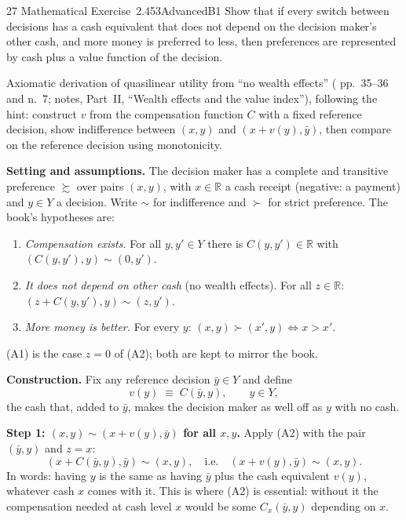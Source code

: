 \begin{exsol}{27}{\MR{} Mathematical Exercise~2.4}{53}{Advanced}{B1}
\asked Show that if every switch between decisions has a cash equivalent that does not depend on
the decision maker's other cash, and more money is preferred to less, then preferences are
represented by cash plus a value function of the decision.

\method Axiomatic derivation of quasilinear utility from ``no wealth effects'' (\MR{} pp.~35--36
and n.~7; notes, Part~II, ``Wealth effects and the value index''), following the hint: construct
$v$ from the compensation function $C$ with a fixed reference decision, show indifference between
$(x, y)$ and $(x + v(y), \bar y)$, then compare on the reference decision using monotonicity.

\solution
\textbf{Setting and assumptions.} The decision maker has a complete and transitive preference
$\succsim$ over pairs $(x, y)$, with $x \in \mathbb{R}$ a cash receipt (negative: a payment) and
$y \in Y$ a decision. Write $\sim$ for indifference and $\succ$ for strict preference. The book's
hypotheses are:
\begin{enumerate}[label=(A\arabic*)]
  \item \emph{Compensation exists.} For all $y, y' \in Y$ there is $C(y, y') \in \mathbb{R}$
  with $(C(y, y'), y) \sim (0, y')$.
  \item \emph{It does not depend on other cash} (no wealth effects). For all $z \in \mathbb{R}$:
  $(z + C(y, y'), y) \sim (z, y')$.
  \item \emph{More money is better.} For every $y$: $(x, y) \succ (x', y) \iff x > x'$.
\end{enumerate}
(A1) is the case $z = 0$ of (A2); both are kept to mirror the book.

\textbf{Construction.} Fix any reference decision $\bar y \in Y$ and define
\[
  v(y) \;\equiv\; C(\bar y, y), \qquad y \in Y ,
\]
the cash that, added to $\bar y$, makes the decision maker as well off as $y$ with no cash.

\textbf{Step 1: $(x, y) \sim (x + v(y), \bar y)$ for all $x, y$.} Apply (A2) with the pair
$(\bar y, y)$ and $z = x$:
\[
  (x + C(\bar y, y), \bar y) \sim (x, y), \quad\text{i.e.}\quad (x + v(y), \bar y) \sim (x, y).
\]
In words: having $y$ is the same as having $\bar y$ plus the cash equivalent $v(y)$, whatever cash
$x$ comes with it. This is where (A2) is essential: without it the compensation needed at cash
level $x$ would be some $C_x(\bar y, y)$ depending on $x$.


\end{exsol}
